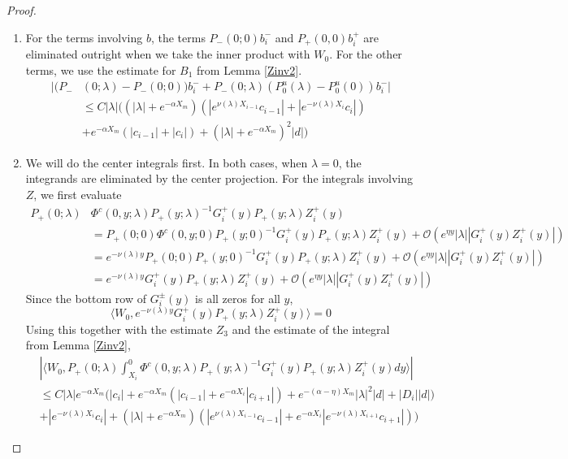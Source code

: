 \documentclass[thesis.tex]{subfiles}
\begin{document}
\begin{lemma}
\begin{proof}
\begin{enumerate}
\item For the terms involving $b$, the terms $P_-(0; 0) b_i^-$ and $P_+(0, 0)b_i^+$ are eliminated outright when we take the inner product with $W_0$. For the other terms, we use the estimate for $B_1$ from Lemma \ref{Zinv2}.
\begin{align*}
|(P_-&(0; \lambda) - P_-(0; 0))b_i^- + P_-(0; \lambda)(P_0^u(\lambda) - P_0^u(0))b_i^-| \\
&\leq C |\lambda| \Big( (|\lambda| + e^{-\alpha X_m})(|e^{\nu(\lambda)X_{i-1}} c_{i-1}| + |e^{-\nu(\lambda)X_i} c_i|) \\
&+ e^{-\alpha X_m}(|c_{i-1}| + |c_i|) + (|\lambda| + e^{-\alpha X_m})^2 |d|  \Big)
\end{align*}

\item We will do the center integrals first. In both cases, when $\lambda = 0$, the integrands are eliminated by the center projection. For the integrals involving $Z$, we first evaluate
\begin{align*}
P_+(0; \lambda) &\Phi^c(0, y; \lambda) P_+(y; \lambda)^{-1} G_i^+(y) P_+(y; \lambda) Z_i^+(y) \\
&= P_+(0; 0) \Phi^c(0, y; 0) P_+(y; 0)^{-1} G_i^+(y) P_+(y; \lambda) Z_i^+(y) + \mathcal{O}(e^{\eta y}|\lambda||G_i^+(y) Z_i^+(y)|) \\
&= e^{-\nu(\lambda) y} P_+(0; 0) P_+(y; 0)^{-1} G_i^+(y) P_+(y; \lambda) Z_i^+(y) + \mathcal{O}(e^{\eta y}|\lambda||G_i^+(y) Z_i^+(y)|) \\
&= e^{-\nu(\lambda) y} G_i^+(y) P_+(y; \lambda) Z_i^+(y) + \mathcal{O}(e^{\eta y}|\lambda||G_i^+(y) Z_i^+(y)|)
\end{align*}
Since the bottom row of $G_i^\pm(y)$ is all zeros for all $y$, 
\[
\langle W_0, e^{-\nu(\lambda) y} G_i^+(y) P_+(y; \lambda) Z_i^+(y) \rangle = 0
\]
Using this together with the estimate $Z_3$ and the estimate of the integral from Lemma \ref{Zinv2},
\begin{align*}
&\left| \langle W_0, P_+(0; \lambda) \int_{X_i}^0 \Phi^c(0, y; \lambda) P_+(y; \lambda)^{-1} G_i^+(y) P_+(y; \lambda) Z_i^+(y) dy \rangle \right| \\
&\leq C |\lambda| e^{-\alpha X_m}\Big(|c_i| + e^{-\alpha X_m}(|c_{i-1}| + e^{-\alpha X_i} |c_{i+1}|) + e^{-(\alpha - \eta) X_m}|\lambda|^2|d| + |D_i||d|) \\
&+ |e^{-\nu(\lambda)X_i} c_i| + (|\lambda| + e^{-\alpha X_m})(|e^{\nu(\lambda)X_{i-1}} c_{i-1}| + e^{-\alpha X_i} |e^{-\nu(\lambda)X_{i+1}} c_{i+1}|)\Big)
\end{align*}

\end{enumerate}
\end{proof}
\end{lemma}
\end{document}
